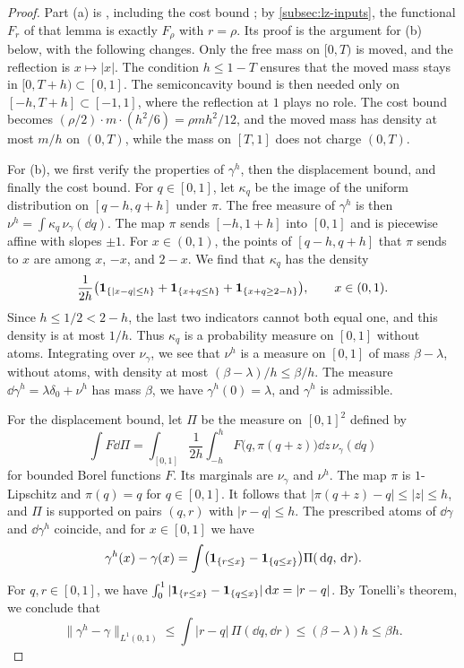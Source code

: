\begin{proof}
Part (a) is \cite[Lemma~7.5]{AL}, including the cost bound
\cite[(7.24)]{AL}; by \cref{subsec:lz-inputs}, the functional $F_r$ of that
lemma is exactly $F_\rho$ with $r=\rho$. Its proof is the
argument for (b) below, with the following changes. Only the free mass on
$[0,T)$ is moved, and the reflection is $x\mapsto|x|$. The condition
$h\le1-T$ ensures that the moved mass stays in $[0,T+h)\subset[0,1]$. The semiconcavity bound
is then needed only on $[-h,T+h]\subset[-1,1]$, where the reflection at $1$
plays no role. The cost bound becomes $(\rho/2)\cdot m\cdot(h^2/6)=\rho
mh^2/12$, and the moved mass
has density at most $m/h$ on $(0,T)$, while the mass on $[T,1]$ does not
charge $(0,T)$.

For (b), we first verify the properties of $\gamma^h$, then the displacement
bound, and finally the cost bound. For $q\in[0,1]$, let $\kappa_q$ be the
image of the uniform distribution on $[q-h,q+h]$ under $\pi$. The free
measure of $\gamma^h$ is then $\nu^h=\int\kappa_q\,\nu_\gamma(\dd q)$. The map
$\pi$ sends $[-h,1+h]$ into $[0,1]$ and is piecewise affine with slopes
$\pm1$. For $x\in(0,1)$, the points of $[q-h,q+h]$ that $\pi$ sends to $x$ are
among $x$, $-x$, and $2-x$. We find that $\kappa_q$ has the density
\[
 \frac1{2h}\bigl(\mathbf1_{\{|x-q|\le h\}}+\mathbf1_{\{x+q\le h\}}
 +\mathbf1_{\{x+q\ge2-h\}}\bigr),\qquad x\in(0,1).
\]
Since $h\le1/2<2-h$, the last two indicators cannot both equal one, and this
density is at most $1/h$. Thus $\kappa_q$ is a probability measure on $[0,1]$
without atoms. Integrating over $\nu_\gamma$, we see that $\nu^h$ is a measure
on $[0,1]$ of mass $\beta-\lambda$, without atoms, with density at most
$(\beta-\lambda)/h\le\beta/h$. The measure $\dd\gamma^h=\lambda\delta_0+\nu^h$
has mass $\beta$, we have $\gamma^h(0)=\lambda$, and $\gamma^h$ is
admissible.

For the displacement bound, let $\Pi$ be the measure on $[0,1]^2$ defined by
\[
 \int F\dd\Pi=\int_{[0,1]}\frac1{2h}\int_{-h}^hF\bigl(q,\pi(q+z)\bigr)\dd z\,
 \nu_\gamma(\dd q)
\]
for bounded Borel functions $F$. Its marginals are $\nu_\gamma$ and $\nu^h$.
The map $\pi$ is $1$-Lipschitz and $\pi(q)=q$ for $q\in[0,1]$. It follows
that $|\pi(q+z)-q|\le|z|\le h$, and $\Pi$ is supported on pairs $(q,r)$ with
$|r-q|\le h$. The prescribed atoms of $\dd\gamma$ and $\dd\gamma^h$ coincide,
and for $x\in[0,1]$ we have
\[
 \gamma^h(x)-\gamma(x)=\int\bigl(\mathbf1_{\{r\le x\}}-\mathbf1_{\{q\le x\}}\bigr)
 \Pi(\,\mathrm d q,\,\mathrm d r).
\]
For $q,r\in[0,1]$, we have $\int_0^1|\mathbf1_{\{r\le x\}}-\mathbf1_{\{q\le x\}}|\,\mathrm d
x=|r-q|$. By Tonelli's theorem, we conclude that
\[
 \|\gamma^h-\gamma\|_{L^1(0,1)}\le\int|r-q|\,\Pi(\dd q,\dd r)
 \le(\beta-\lambda)h\le\beta h .
\]


\end{proof}

